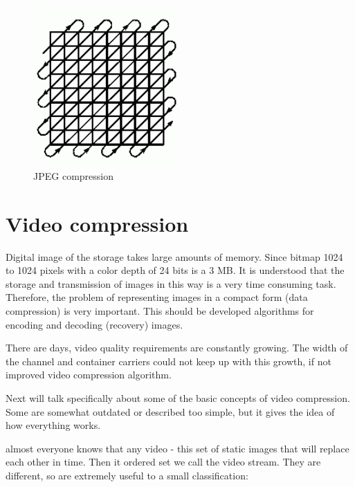 \begin{figure}[h]
    \centering
    \includegraphics[width=0.5\textwidth]{Figures/jpeg_compression}
    \caption{JPEG compression}
    \label{fig:jpeg_compression}
\end{figure}


\section{Video compression}
Digital image of the storage takes large amounts of memory. Since bitmap 1024 to 1024 pixels with a color depth of 24 bits is a 3 MB. It is understood that the storage and transmission of images in this way is a very time consuming task. Therefore, the problem of representing images in a compact form (data compression) is very important. This should be developed algorithms for encoding and decoding (recovery) images.

There are days, video quality requirements are constantly growing. The width of the channel and container carriers could not keep up with this growth, if not improved video compression algorithm.

Next will talk specifically about some of the basic concepts of video compression. Some are somewhat outdated or described too simple, but it gives the idea of how everything works.

almost everyone knows that any video - this set of static images that will replace each other in time. Then it ordered set we call the video stream. They are different, so are extremely useful to a small classification:

